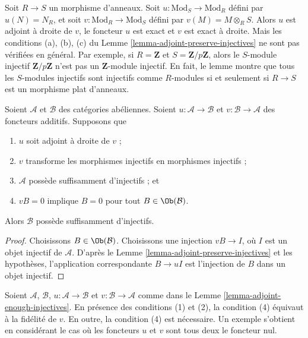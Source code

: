 \begin{remark}
\label{remark-need-left-exactness}
Soit $R \to S$ un morphisme d'anneaux. Soit
$u : \text{Mod}_S \to \text{Mod}_R$ défini par $u(N) = N_R$, et soit
$v : \text{Mod}_R \to \text{Mod}_S$ défini par
$v(M) = M \otimes_R S$. Alors $u$ est adjoint à droite de $v$, le foncteur
$u$ est exact et $v$ est exact à droite. Mais les conditions (a), (b), (c) du
Lemme \ref{lemma-adjoint-preserve-injectives} ne sont pas vérifiées en général.
Par exemple, si $R = \mathbf{Z}$ et $S = \mathbf{Z}/p\mathbf{Z}$, alors
le $S$-module injectif $\mathbf{Z}/p\mathbf{Z}$ n'est pas
un $\mathbf{Z}$-module injectif. En fait, le lemme montre que
tous les $S$-modules injectifs sont injectifs comme $R$-modules si et seulement
si $R \to S$ est un morphisme plat d'anneaux.
\end{remark}

\begin{lemma}
\label{lemma-adjoint-enough-injectives}
Soient $\mathcal{A}$ et $\mathcal{B}$ des catégories abéliennes.
Soient $u : \mathcal{A} \to \mathcal{B}$ et
$v : \mathcal{B} \to \mathcal{A}$ des foncteurs additifs.
Supposons que
\begin{enumerate}
\item $u$ soit adjoint à droite de $v$ ;
\item $v$ transforme les morphismes injectifs en morphismes injectifs ;
\item $\mathcal{A}$ possède suffisamment d'injectifs ; et
\item $vB = 0$ implique $B = 0$ pour tout $B \in \Ob(\mathcal{B})$.
\end{enumerate}
Alors $\mathcal{B}$ possède suffisamment d'injectifs.
\end{lemma}

\begin{proof}
Choisissons $B \in \Ob(\mathcal{B})$.
Choisissons une injection $vB \to I$, où $I$
est un objet injectif de $\mathcal{A}$.
D'après le Lemme \ref{lemma-adjoint-preserve-injectives}
et les hypothèses, l'application correspondante
$B \to uI$ est l'injection de $B$ dans un objet injectif.
\end{proof}

\begin{remark}
\label{remark-faithfulness-needed}
Soient $\mathcal{A}$, $\mathcal{B}$,
$u : \mathcal{A} \to \mathcal{B}$ et
$v : \mathcal{B} \to \mathcal{A}$ comme dans le
Lemme \ref{lemma-adjoint-enough-injectives}.
En présence des conditions (1) et (2), la condition (4) équivaut à la
fidélité de $v$. En outre, la condition (4) est nécessaire.
Un exemple s'obtient en considérant le cas où les foncteurs $u$ et $v$
sont tous deux le foncteur nul.
\end{remark}

